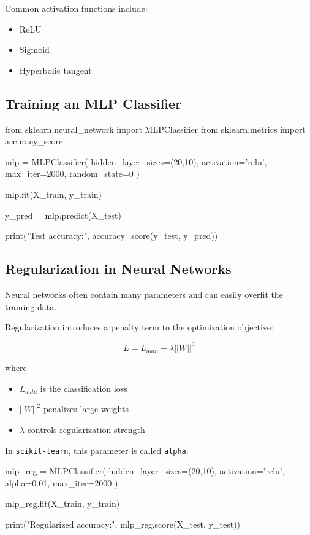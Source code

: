 \documentclass[12pt]{article}
\begin{document}
Common activation functions include:

\begin{itemize}
\item ReLU
\item Sigmoid
\item Hyperbolic tangent
\end{itemize}

\subsection{Training an MLP Classifier}

\begin{py-box}
from sklearn.neural_network import MLPClassifier
from sklearn.metrics import accuracy_score

mlp = MLPClassifier(
    hidden_layer_sizes=(20,10),
    activation='relu',
    max_iter=2000,
    random_state=0
)

mlp.fit(X_train, y_train)

y_pred = mlp.predict(X_test)

print("Test accuracy:", accuracy_score(y_test, y_pred))
\end{py-box}

\subsection{Regularization in Neural Networks}

Neural networks often contain many parameters and can easily overfit the training data.

Regularization introduces a penalty term to the optimization objective:

\[
L = L_{data} + \lambda ||W||^2
\]

where

\begin{itemize}
\item $L_{data}$ is the classification loss
\item $||W||^2$ penalizes large weights
\item $\lambda$ controls regularization strength
\end{itemize}

In \texttt{scikit-learn}, this parameter is called \texttt{alpha}.

\begin{py-box}
mlp_reg = MLPClassifier(
    hidden_layer_sizes=(20,10),
    activation='relu',
    alpha=0.01,
    max_iter=2000
)

mlp_reg.fit(X_train, y_train)

print("Regularized accuracy:", mlp_reg.score(X_test, y_test))
\end{py-box}
\end{document}
